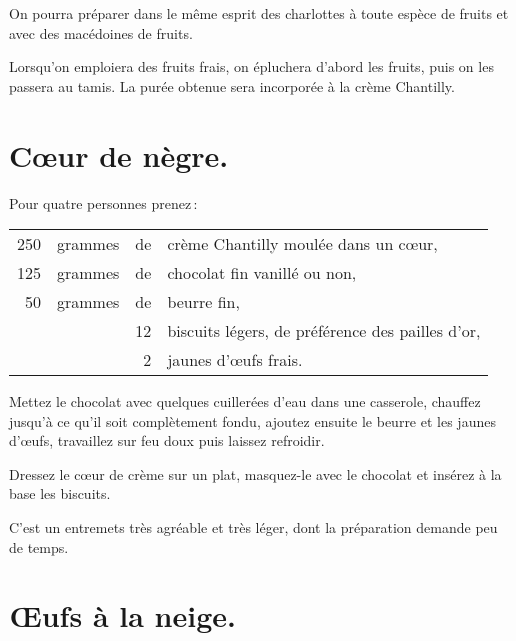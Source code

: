 \sk

On pourra préparer dans le même esprit des charlottes à toute espèce de fruits
et avec des macédoines de fruits.

Lorsqu'on emploiera des fruits frais, on épluchera d’abord les fruits, puis on
les passera au tamis. La purée obtenue sera incorporée à la crème Chantilly.

\section*{\centering Cœur de nègre.}
{}

Pour quatre personnes prenez :

\footnotesize
\begin{longtable}{rrrp{16em}}
    250 & grammes & de & crème Chantilly moulée dans un cœur,                                             \\
    125 & grammes & de & chocolat fin vanillé ou non,                                                     \\
     50 & grammes & de & beurre fin,                                                                      \\
        &         & 12 & biscuits légers, de préférence des pailles d'or,                                 \\
        &         &  2 & jaunes d'œufs frais.                                                             \\
\end{longtable}
\normalsize

Mettez le chocolat avec quelques cuillerées d'eau dans une casserole, chauffez
jusqu'à ce qu'il soit complètement fondu, ajoutez ensuite le beurre et les
jaunes d'œufs, travaillez sur feu doux puis laissez refroidir.

Dressez le cœur de crème sur un plat, masquez-le avec le chocolat et insérez à
la base les biscuits.

C'est un entremets très agréable et très léger, dont la préparation demande peu
de temps.

\section*{\centering Œufs à la neige.}
{}

